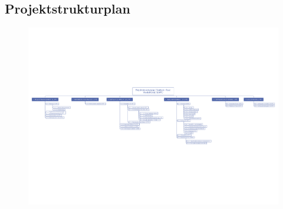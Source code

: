 

\begin{landscape}
\chapter{Projektstrukturplan}
\begin{figure}[H]
\centering
\includegraphics[scale=0.85]{images/plan.pdf}
\end{figure}
\end{landscape}

